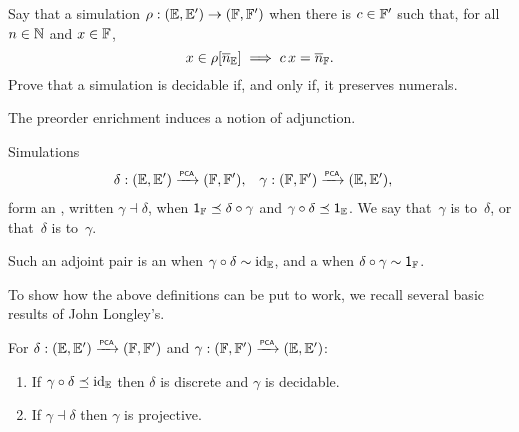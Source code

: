 \begin{exercise}
  \label{exc:simulation-numerals}%
  Say that a simulation $\rho: (\EE, \subEE) \to (\FF, \subFF)$ 
  when there is $c \in \subFF$ such that, for all $n \in \NN$ and $x \in \FF$,
  \begin{equation*}
    x \in \rho[\overline{n}_\EE] \implies c \, x = \overline{n}_\FF.
  \end{equation*}
  Prove that a simulation is decidable if, and only if, it preserves numerals.
\end{exercise}


The preorder enrichment induces a notion of adjunction.

\begin{definition}
  Simulations
  \begin{align*}
    \delta &: (\EE, \subEE) \pcato (\FF, \subFF),
    &
    \gamma &: (\FF, \subFF) \pcato (\EE, \subEE),
  \end{align*}
  form an , written $\gamma \dashv \delta$, when
  $\one_{\FF} \preceq \delta \circ \gamma$ and $\gamma \circ
  \delta \preceq \one_{\EE}$. We say that~$\gamma$ is  to~$\delta$, or that~$\delta$ is 
  to~$\gamma$.

  Such an adjoint pair is an  when $\gamma \circ \delta \sim \id[\EE]$, and a
   when $\delta \circ \gamma \sim \one_\FF$.
\end{definition}

To show how the above definitions can be put to work, we recall several basic results of John Longley's.

\begin{theorem}
  \label{th:simulation-properties2}%
  For $\delta: (\EE, \subEE) \pcato (\FF, \subFF)$ and
  $\gamma: (\FF, \subFF) \pcato (\EE, \subEE)$:
  \begin{enumerate}
  \item
    If $\gamma \circ \delta \preceq \id[\EE]$ then $\delta$ is discrete 
    and $\gamma$ is decidable.
  \item
    If $\gamma \dashv \delta$ then $\gamma$ is projective.
  \end{enumerate}
\end{theorem}


